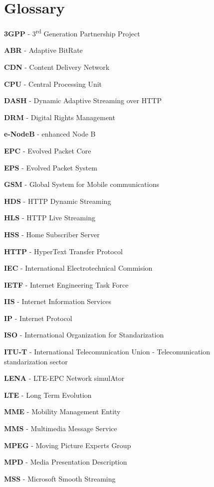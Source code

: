 \cleardoublepage
{}
\chapter*{Glossary}


\textbf{3GPP} - 3\textsuperscript{rd} Generation Partnership Project

\textbf{ABR} - Adaptive BitRate

\textbf{CDN} - Content Delivery Network

\textbf{CPU} - Central Processing Unit

\textbf{DASH} - Dynamic Adaptive Streaming over HTTP

\textbf{DRM} - Digital Rights Management

\textbf{e-NodeB} - enhanced Node B

\textbf{EPC} - Evolved Packet Core

\textbf{EPS} - Evolved Packet System

\textbf{GSM} - Global System for Mobile communications

\textbf{HDS} - HTTP Dynamic Streaming

\textbf{HLS} - HTTP Live Streaming

\textbf{HSS} - Home Subscriber Server

\textbf{HTTP} - HyperText Transfer Protocol

\textbf{IEC} - International Electrotechnical Commision

\textbf{IETF} - Internet Engineering Task Force

\textbf{IIS} - Internet Information Services

\textbf{IP} - Internet Protocol

\textbf{ISO} - International Organization for Standarization

\textbf{ITU-T} - International Telecomunication Union - Telecomunication standarization sector

\textbf{LENA} - LTE-EPC Network simulAtor

\textbf{LTE} - Long Term Evolution

\textbf{MME} - Mobility Management Entity

\textbf{MMS} - Multimedia Message Service

\textbf{MPEG} - Moving Picture Experts Group

\textbf{MPD} - Media Presentation Description

\textbf{MSS} - Microsoft Smooth Streaming

